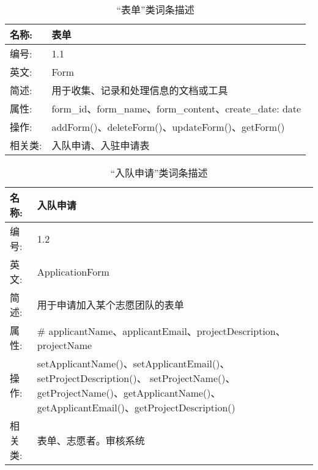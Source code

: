 \begin{table}[H]  
\caption{“表单”类词条描述}  
\begin{center}  
    \begin{tabular}{l p{11cm}} 
        \hline
        \quad 名称:  &  表单 \\
        \hline
        \quad 编号:  & 1.1 \\
        \hline
        \quad 英文:  &  Form \\
        \hline
        \quad 简述:  & 用于收集、记录和处理信息的文档或工具 \\
        \hline
        \quad 属性:  & form\_id、form\_name、form\_content、create\_date: date\\
        \hline
        \quad 操作:  & addForm()、deleteForm()、updateForm()、getForm()\\
        \hline
        \quad 相关类:  & 入队申请、入驻申请表 \\
        \hline
    \end{tabular}
\end{center}
\end{table}

\begin{table}[H]  
\caption{“入队申请”类词条描述}  
\begin{center}  
    \begin{tabular}{l p{11cm}} 
        \hline
        \quad 名称:  &  入队申请 \\
        \hline
        \quad 编号:  & 1.2 \\
        \hline
        \quad 英文:  & ApplicationForm\\
        \hline
        \quad 简述:  & 用于申请加入某个志愿团队的表单 \\
        \hline
        \quad 属性:  & # applicantName、applicantEmail、projectDescription、projectName\\
        \hline
        \quad 操作:  & setApplicantName()、setApplicantEmail()、setProjectDescription()、 setProjectName()、getProjectName()、getApplicantName()、getApplicantEmail()、getProjectDescription()\\
        \hline
        \quad 相关类:  & 表单、志愿者。审核系统 \\
        \hline
    \end{tabular}
\end{center}
\end{table}

